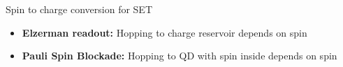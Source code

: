 \documentclass[../main.tex]{subfiles}
\begin{document}
\begin{frame}{Spin to charge conversion for SET}
\begin{itemize}
    \item \textbf{Elzerman readout:} Hopping to charge reservoir depends on spin
    \item \textbf{Pauli Spin Blockade:}  Hopping to QD with spin inside depends on spin
\end{itemize}
\end{frame}

%
\end{document}
